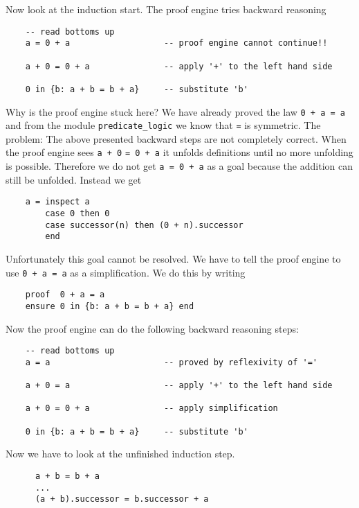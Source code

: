 Now look at the induction start. The proof engine tries backward reasoning
\begin{lstlisting}
    -- read bottoms up
    a = 0 + a                   -- proof engine cannot continue!!

    a + 0 = 0 + a               -- apply '+' to the left hand side

    0 in {b: a + b = b + a}     -- substitute 'b'
\end{lstlisting}

Why is the proof engine stuck here? We have already proved the law
\lstinline!0 + a = a! and from the module \lstinline!predicate_logic! we know
that \lstinline!=! is symmetric. The problem: The above presented backward
steps are not completely correct. When the proof engine sees \lstinline!a + 0!
\lstinline!= 0 + a! it unfolds definitions until no more unfolding is
possible. Therefore we do not get \lstinline!a = 0 + a! as a goal because the
addition can still be unfolded. Instead we get

\begin{lstlisting}
    a = inspect a
        case 0 then 0
        case successor(n) then (0 + n).successor
        end
\end{lstlisting}
Unfortunately this goal cannot be resolved. We have to tell the proof engine
to use \lstinline!0 + a = a! as a simplification. We do this by writing

\begin{lstlisting}
    proof  0 + a = a
    ensure 0 in {b: a + b = b + a} end
\end{lstlisting}

Now the proof engine can do the following backward reasoning steps:

\begin{lstlisting}
    -- read bottoms up
    a = a                       -- proved by reflexivity of '='

    a + 0 = a                   -- apply '+' to the left hand side

    a + 0 = 0 + a               -- apply simplification

    0 in {b: a + b = b + a}     -- substitute 'b'
\end{lstlisting}

Now we have to look at the unfinished induction step.

\begin{lstlisting}
      a + b = b + a
      ...
      (a + b).successor = b.successor + a
\end{lstlisting}

